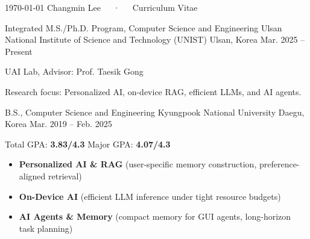 \documentclass[11pt, a4paper]{awesome-cv}
\newenvironment{cvlist}[1][1.5mm]{%
  \begin{cvparagraph}
  \begin{itemize}[leftmargin=2ex, topsep=0pt, partopsep=0pt, parsep=0pt, itemsep=#1]
  \renewcommand{\labelitemi}{\bullet}%
}{%
  \end{itemize}
  \end{cvparagraph}
}
\begin{document}
\makecvheader[R]

\makecvfooter
  {\today}
  {Changmin Lee~~~·~~~Curriculum Vitae}
  {}

\begin{cventries}
  \cventry
    {Integrated M.S./Ph.D. Program, Computer Science and Engineering}
    {Ulsan National Institute of Science and Technology (UNIST)}
    {Ulsan, Korea}
    {Mar. 2025 -- Present}
    {
      \begin{cvitems}
        \item {UAI Lab, Advisor: Prof. Taesik Gong}
        \item {Research focus: Personalized AI, on-device RAG, efficient LLMs, and AI agents.}
      \end{cvitems}
    }
  \cventry
    {B.S., Computer Science and Engineering}
    {Kyungpook National University}
    {Daegu, Korea}
    {Mar. 2019 -- Feb. 2025}
    {
      \begin{cvitems}
        \item {Total GPA: \textbf{3.83/4.3} \quad Major GPA: \textbf{4.07/4.3}}
      \end{cvitems}
    }
\end{cventries}

\begin{cvlist}[1mm]
  \item {\textbf{Personalized AI \& RAG} (user-specific memory construction, preference-aligned retrieval)}
  \item {\textbf{On-Device AI} (efficient LLM inference under tight resource budgets)}
  \item {\textbf{AI Agents \& Memory} (compact memory for GUI agents, long-horizon task planning)}
\end{cvlist}
\end{document}
